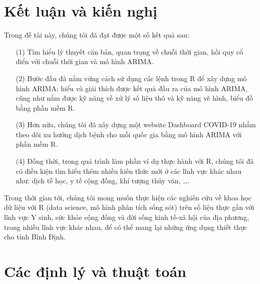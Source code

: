 \documentclass[12pt, a4paper,oneside]{book}
\theoremstyle{definition}
\begin{document}
\chapter*{Kết luận và kiến nghị}
Trong đề tài này, chúng tôi đã đạt được một số kết quả sau: 
\begin{itemize}
	\item[(1)] Tìm hiểu lý thuyết căn bản, quan trọng về chuỗi thời gian, hồi quy cổ điển với chuỗi thời gian và mô hình ARIMA.
	\item[(2)] Bước đầu đã nắm vững cách sử dụng các lệnh trong R để xây dựng mô hình ARIMA; hiểu và giải thích được kết quả đầu ra của mô hình ARIMA, cũng như nắm được kỹ năng về xử lý số liệu thô và kỹ năng vẽ hình, biểu đồ bằng phần mềm R.
	\item[(3)] Hơn nữa, chúng tôi đã xây dựng một website Dashboard COVID-19 nhằm theo dõi xu hướng dịch bệnh cho mỗi quốc gia bằng mô hình ARIMA với phần mềm R.
	\item[(4)] Đồng thời, trong quá trình làm phần ví dụ thực hành với R, chúng tôi đã có điều kiện tìm hiểu thêm nhiều kiến thức mới ở các lĩnh vực khác nhau như: dịch tễ học, y tế cộng đồng, khí tượng thủy văn, \dots.
\end{itemize}
Trong thời gian tới, chúng tôi mong muốn thực hiện các nghiên cứu về khoa học dữ liệu với R (data science, mô hình phân tích sống sót) trên số liệu thực gắn với lĩnh vực Y sinh, sức khỏe cộng đồng và đời sống kinh tế-xã hội của địa phương, trong nhiều lĩnh vực khác nhau, để có thể mang lại những ứng dụng thiết thực cho tỉnh Bình Định.

\appendix
\chapter{Các định lý và thuật toán}
\end{document}
